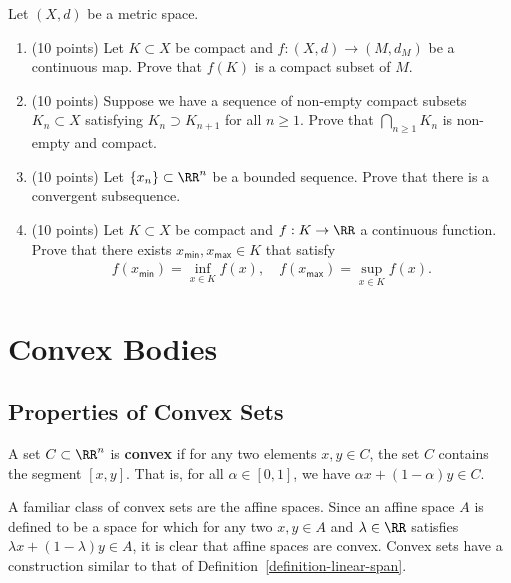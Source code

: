 \documentclass[11pt]{article}
\begin{document}
    \begin{prob}
        Let $(X, d)$ be a metric space.
        \begin{enumerate}[label = (\alph*)]
            \item (10 points) Let $K \subset X$ be compact and $f : (X, d) \to (M, d_M)$ be a continuous map. Prove that $f(K)$ is a compact subset of $M$.
            \item (10 points) Suppose we have a sequence of non-empty compact subsets $K_n \subset X$ satisfying $K_n \supset K_{n+1}$ for all $n \geq 1$. Prove that $\bigcap_{n \geq 1} K_n$ is non-empty and compact. 
            \item (10 points) Let $\{x_n\} \subset \RR^n$ be a bounded sequence. Prove that there is a convergent subsequence.
            \item (10 points) Let $K \subset X$ be compact and $f : K \to \RR$ a continuous function. Prove that there exists $x_{\mathsf{min}}, x_{\mathsf{max}} \in K$ that satisfy
            \begin{align*}
                    f(x_{\mathsf{min}}) = \inf_{x \in K} f(x), \quad f(x_{\mathsf{max}}) = \sup_{x \in K} f(x). 
            \end{align*}
        \end{enumerate}    
    \end{prob}
    
\newpage 

\section{Convex Bodies}
\subsection{Properties of Convex Sets}

\begin{defn}\label{definition-convex-set}
 A set $C \subset \RR^n$ is \textbf{convex} if for any two elements $x, y \in C$, the set $C$ contains the segment $[x, y]$. That is, for all $\alpha \in [0, 1]$, we have $\alpha x + (1-\alpha) y \in C$. 
\end{defn}

A familiar class of convex sets are the affine spaces. Since an affine space $A$ is defined to be a space for which for any two $x, y \in A$ and $\lambda \in \RR$ satisfies $\lambda x + (1-\lambda)y \in A$, it is clear that affine spaces are convex. Convex sets have a construction similar to that of Definition~\ref{definition-linear-span}.
\end{document}

